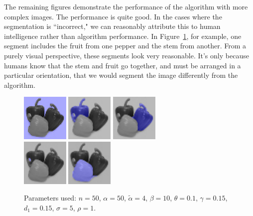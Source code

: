 \documentclass[12pt]{article}%
\begin{document}
The remaining figures demonstrate the performance of the algorithm with more complex images. The performance is quite good. In the cases where the segmentation is ``incorrect," we can reasonably attribute this to human intelligence rather than algorithm performance. In Figure~\ref{fig:peppers}, for example, one segment includes the fruit from one pepper and the stem from another. From a purely visual perspective, these segments look very reasonable. It's only because humans know that the stem and fruit go together, and must be arranged in a particular orientation, that we would segment the image differently from the algorithm.\\

\begin{figure}[ht]
\centering
\includegraphics[width=0.2\textwidth,height=0.2\textwidth]{peppers_seg_1.png} \hspace{.45cm}
\includegraphics[width=0.2\textwidth,height=0.2\textwidth]{peppers_seg_2.png} \hspace{.45cm}
\includegraphics[width=0.2\textwidth,height=0.2\textwidth]{peppers_seg_3.png} \\ \vspace{.45cm}
\includegraphics[width=0.2\textwidth,height=0.2\textwidth]{peppers_seg_4.png} \hspace{.45cm}
\includegraphics[width=0.2\textwidth,height=0.2\textwidth]{peppers_seg_5.png}
\caption{Parameters used: $n = 50$, $\alpha = 50$, $\tilde{\alpha} = 4$, $\beta = 10$, $\theta = 0.1$, $\gamma = 0.15$, $d_1 = 0.15$, $\sigma = 5$, $\rho = 1$.}
\label{fig:peppers}
\end{figure}
\end{document}
